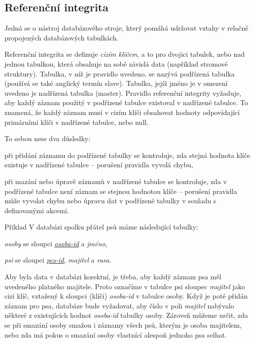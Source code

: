 \subsection{Referenční integrita}

Jedná se o nástroj databázového stroje, který pomáhá udržovat
vztahy v relačně propojených databázových tabulkách.

Referenční integrita se definuje \emph{cizím klíčem}, a to pro dvojici tabulek,
nebo nad jednou tabulkou, která obsahuje na sobě závislá data (například
stromové struktury). Tabulka, v níž je pravidlo uvedeno, se nazývá podřízená
tabulka (používá se také anglický termín slave). Tabulka, jejíž jméno je v
omezení uvedeno je nadřízená tabulka (master). Pravidlo referenční integrity
vyžaduje, aby každý záznam použitý v podřízené tabulce existoval v nadřízené
tabulce. To znamená, že každý záznam musí v cizím klíči obsahovat hodnoty
odpovídající primárními klíči v nadřízené tabulce, nebo null.

To sebou nese dva důsledky:
\begin{pitemize}
\item při přidání záznamu do podřízené tabulky se kontroluje, zda stejná hodnota
klíče existuje v nadřízené tabulce – porušení pravidla vyvolá chybu,
\item při mazání nebo úpravě záznamů v nadřízené tabulce se kontroluje, zda
v podřízené tabulce není záznam se stejnou hodnotou klíče – porušení pravidla
může vyvolat chybu nebo úpravu dat v podřízené tabulky v souladu s definovanými
akcemi.
\end{pitemize}

\begin{obecne}{Příklad}
V databázi spolku přátel psů máme následující tabulky:
\begin{pitemize}
 \item \emph{osoby} se sloupci \emph{\underline{osoba-id}} a \emph{jméno},
 \item \emph{psi} se sloupci \emph{\underline{pes-id}}, \emph{majitel} a \emph{rasa}.
\end{pitemize}

Aby byla data v databázi korektní, je třeba, aby každý záznam psa měl uvedeného
platného majitele. Proto označíme v tabulce psi sloupec \emph{majitel} jako cizí
klíč, vztažený k sloupci (klíči) \emph{osoba-id} v tabulce osoby. Když je poté
přidán záznam pro psa, databáze bude vyžadovat, aby číslo v poli \emph{majitel}
nabývalo některé z existujících hodnot \emph{osoba-id} tabulky osoby. Zároveň
můžeme určit, zda se při smazání osoby smažou i záznamy všech psů, kterým je
osoba majitelem, nebo zda má pokus o smazání osoby vlastnící alespoň jednoho psa
selhat.
\end{obecne}

